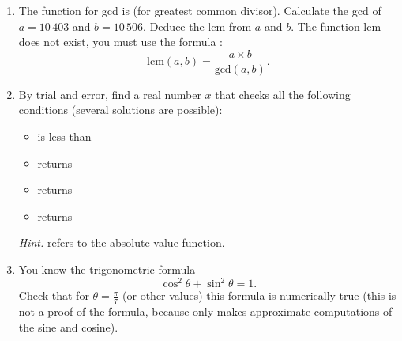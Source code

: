 \documentclass[11pt,class=report,crop=false]{standalone}
\begin{document}
\begin{activite}


\begin{enumerate}
  \item The \Python{} function for gcd is  (for greatest common divisor). Calculate the gcd of $a = 10\,403$ and $b = 10\,506$. Deduce the lcm from $a$ and $b$. The function lcm does not exist, you must use the formula :
  $$\text{lcm}(a,b) = \frac{a \times b}{\text{gcd}(a,b)}.$$
  
  \item By trial and error, find a real number $x$ that checks all the following conditions (several solutions are possible):
  \begin{itemize}
    \item {} is less than 
    \item {} returns 
    \item {} returns 
    \item {} returns  
  \end{itemize}
 
  \emph{Hint.}  refers to the absolute value function.
  
  \item You know the trigonometric formula 
  $$\cos^2 \theta + \sin^2 \theta = 1.$$
  Check that for $\theta = \frac\pi7$ (or other values) this formula is numerically true (this is not a proof of the formula, because \Python{} only makes approximate computations of the sine and cosine).
\end{enumerate}  
\end{activite}


\end{document}
